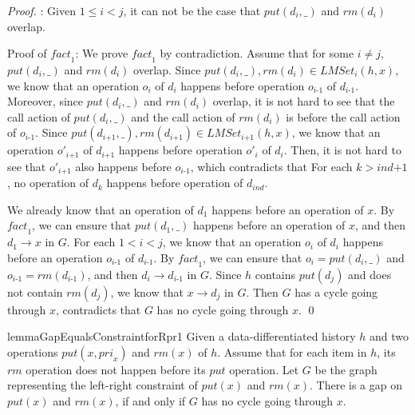 \begin {proof}
: Given $1 \leq i < j$, it can not be the case that $\textit{put}(d_i,\_)$ and $\textit{rm}(d_i)$ overlap.

Proof of $\textit{fact}_1$: We prove $\textit{fact}_1$ by contradiction. Assume that for some $i \neq j$, $\textit{put}(d_i,\_)$ and $\textit{rm}(d_i)$ overlap. Since $\textit{put}(d_i,\_), \textit{rm}(d_i) \in \textit{LMSet}_i(h,x)$, we know that an operation $o_i$ of $d_i$ happens before operation $o_{\textit{i-1}}$ of $d_{\textit{i-1}}$. Moreover, since $\textit{put}(d_i,\_)$ and $\textit{rm}(d_i)$ overlap, it is not hard to see that the call action of $\textit{put}(d_i,\_)$ and the call action of $\textit{rm}(d_i)$ is before the call action of $o_{\textit{i-1}}$. Since $\textit{put}(d_{\textit{i+1}},\_), \textit{rm}(d_{\textit{i+1}}) \in \textit{LMSet}_{\textit{i+1}}(h,x)$, we know that an operation $o'_{\textit{i+1}}$ of $d_{\textit{i+1}}$ happens before operation $o'_i$ of $d_i$. Then, it is not hard to see that $o'_{\textit{i+1}}$ also happens before $o_{\textit{i-1}}$, which contradicts that For each $k > \textit{ind+1}$, no operation of $d_k$ happens before operation of $d_{\textit{ind}}$.

We already know that an operation of $d_1$ happens before an operation of $x$. By $\textit{fact}_1$, we can ensure that $\textit{put}(d_1,\_)$ happens before an operation of $x$, and then $d_1 \rightarrow x$ in $G$. For each $1 < i < j$, we know that an operation $o_i$ of $d_i$ happens before an operation $o_{\textit{i-1}}$ of $d_{\textit{i-1}}$. By $\textit{fact}_1$, we can ensure that $o_i=\textit{put}(d_i,\_)$ and $o_{\textit{i-1}}=\textit{rm}(d_{\textit{i-1}})$, and then $d_i \rightarrow d_{\textit{i-1}}$ in $G$. Since $h$ contains $\textit{put}(d_j)$ and does not contain $\textit{rm}(d_j)$, we know that $x \rightarrow d_j$ in $G$. Then $G$ has a cycle going through $x$, contradicts that $G$ has no cycle going through $x$. \qed
\end {proof}



\begin{restatable}{lemma}{GapEqualsConstraintforRpr1}
\label{lemma:Gap Equals Constraint for Rpr1}
Given a data-differentiated history $h$ and two operations $\textit{put}(x,\textit{pri}_x)$ and $\textit{rm}(x)$ of $h$. %
Assume that for each item in $h$, its $\textit{rm}$ operation does not happen before its $\textit{put}$ operation. Let $G$ be the graph representing the left-right constraint of $\textit{put}(x)$ and $\textit{rm}(x)$. There is a gap on $\textit{put}(x)$ and $\textit{rm}(x)$, if and only if $G$ has no cycle going through $x$.
\end{restatable}

